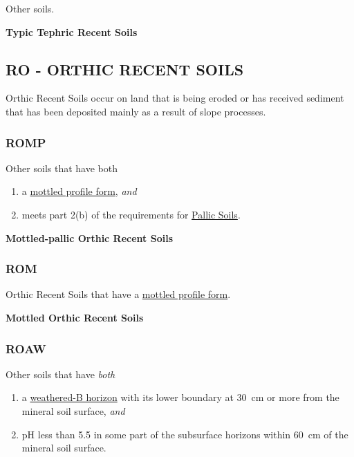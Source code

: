\documentclass[
  letterpaper,
  DIV=11,
  numbers=noendperiod]{scrreprt}
\providecommand{\tightlist}{%
  \setlength{\itemsep}{0pt}\setlength{\parskip}{0pt}}\usepackage{longtable,booktabs,array}
\begin{document}
Other soils.

\textbf{Typic Tephric Recent Soils}

\hypertarget{sec-RO}{%
\subsection{\texorpdfstring{\textbf{RO} - ORTHIC RECENT
SOILS}{RO - ORTHIC RECENT SOILS}}\label{sec-RO}}

Orthic Recent Soils occur on land that is being eroded or has received
sediment that has been deposited mainly as a result of slope processes.

\hypertarget{sec-key-ROMP}{%
\subsubsection{\texorpdfstring{\textbf{ROMP}}{ROMP}}\label{sec-key-ROMP}}

Other soils that have both

\begin{enumerate}
\def\labelenumi{\arabic{enumi}.}
\tightlist
\item
  a \protect\hyperlink{sec-diag-mottpf}{mottled profile form},
  \emph{and}
\item
  meets part 2(b) of the requirements for
  \protect\hyperlink{sec-P}{Pallic Soils}.
\end{enumerate}

\textbf{Mottled-pallic Orthic Recent Soils}

\hypertarget{sec-key-ROM}{%
\subsubsection{\texorpdfstring{\textbf{ROM}}{ROM}}\label{sec-key-ROM}}

Orthic Recent Soils that have a
\protect\hyperlink{sec-diag-mottpf}{mottled profile form}.

\textbf{Mottled Orthic Recent Soils}

\hypertarget{sec-key-ROAW}{%
\subsubsection{\texorpdfstring{\textbf{ROAW}}{ROAW}}\label{sec-key-ROAW}}

Other soils that have \emph{both}

\begin{enumerate}
\def\labelenumi{\arabic{enumi}.}
\tightlist
\item
  a \protect\hyperlink{sec-diag-bw}{weathered-B horizon} with its lower
  boundary at 30~cm or more from the mineral soil surface, \emph{and}
\item
  pH less than 5.5 in some part of the subsurface horizons within 60~cm
  of the mineral soil surface.
\end{enumerate}
\end{document}
